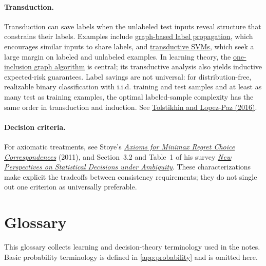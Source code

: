 \documentclass[11pt,twoside]{article}
\theoremstyle{definition}
\theoremstyle{remark}
\begin{document}
\paragraph{Transduction.}
Transduction can save labels when the unlabeled test inputs reveal structure
that constrains their labels. Examples include
\href{https://www.cs.cmu.edu/~zhuxj/pub/zgl.pdf}{graph-based label propagation},
which encourages similar inputs to share labels, and
\href{https://www.cs.cornell.edu/people/tj/publications/joachims_99c.pdf}{transductive SVMs},
which seek a large margin on labeled and unlabeled examples. In learning
theory, the
\href{https://arxiv.org/abs/2212.09270}{one-inclusion graph algorithm}
is central; its transductive analysis also yields inductive expected-risk
guarantees. Label savings are not universal: for distribution-free, realizable
binary classification with i.i.d. training and test samples and at least as
many test as training examples, the optimal labeled-sample complexity has the
same order in transduction and induction. See
\href{https://arxiv.org/abs/1602.03027}{Tolstikhin and Lopez-Paz (2016)}.

\paragraph{Decision criteria.}
For axiomatic treatments, see Stoye's
\href{https://stoye.economics.cornell.edu/docs/AxiomsRegret.pdf}{\emph{Axioms
for Minimax Regret Choice Correspondences}} (2011), and Section~3.2 and
Table~1 of his survey
\href{https://stoye.economics.cornell.edu/docs/ARE.pdf}{\emph{New Perspectives
on Statistical Decisions under Ambiguity}}. These characterizations make
explicit the tradeoffs between consistency requirements; they do not single
out one criterion as universally preferable.


\clearpage

\section*{Glossary}

This glossary collects learning and decision-theory terminology used in the
notes. Basic probability terminology is defined in \cref{app:probability}
and is omitted here.
\end{document}
